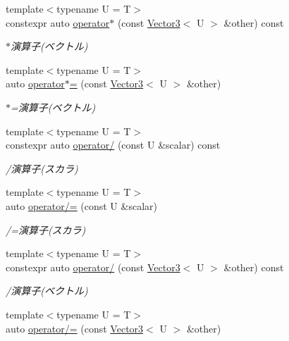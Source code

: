 \begin{DoxyCompactItemize}
{\footnotesize template$<$typename U  = T$>$ }\\constexpr auto \mbox{\hyperlink{classsaki_1_1_vector3_adec0a13c42a1a0cb6af68622b649f8b5}{operator$\ast$}} (const \mbox{\hyperlink{classsaki_1_1_vector3}{Vector3}}$<$ U $>$ \&other) const
\begin{DoxyCompactList}\small\item\em $\ast$演算子(ベクトル) \end{DoxyCompactList}\item 
{\footnotesize template$<$typename U  = T$>$ }\\auto \mbox{\hyperlink{classsaki_1_1_vector3_a7c68761dd40e55adf0dd8373c2b0e1a7}{operator$\ast$=}} (const \mbox{\hyperlink{classsaki_1_1_vector3}{Vector3}}$<$ U $>$ \&other)
\begin{DoxyCompactList}\small\item\em $\ast$=演算子(ベクトル) \end{DoxyCompactList}\item 
{\footnotesize template$<$typename U  = T$>$ }\\constexpr auto \mbox{\hyperlink{classsaki_1_1_vector3_a0d015d863a635445b8f6456dfa2d94ec}{operator/}} (const U \&scalar) const
\begin{DoxyCompactList}\small\item\em /演算子(スカラ) \end{DoxyCompactList}\item 
{\footnotesize template$<$typename U  = T$>$ }\\auto \mbox{\hyperlink{classsaki_1_1_vector3_aacf8494aa9c503f70bad8039e1f926b9}{operator/=}} (const U \&scalar)
\begin{DoxyCompactList}\small\item\em /=演算子(スカラ) \end{DoxyCompactList}\item 
{\footnotesize template$<$typename U  = T$>$ }\\constexpr auto \mbox{\hyperlink{classsaki_1_1_vector3_a902c894c260b73d50173a4e78b90e24a}{operator/}} (const \mbox{\hyperlink{classsaki_1_1_vector3}{Vector3}}$<$ U $>$ \&other) const
\begin{DoxyCompactList}\small\item\em /演算子(ベクトル) \end{DoxyCompactList}\item 
{\footnotesize template$<$typename U  = T$>$ }\\auto \mbox{\hyperlink{classsaki_1_1_vector3_a65eeb9e82784752ccde12b72a33da67e}{operator/=}} (const \mbox{\hyperlink{classsaki_1_1_vector3}{Vector3}}$<$ U $>$ \&other)

\end{DoxyCompactItemize}
